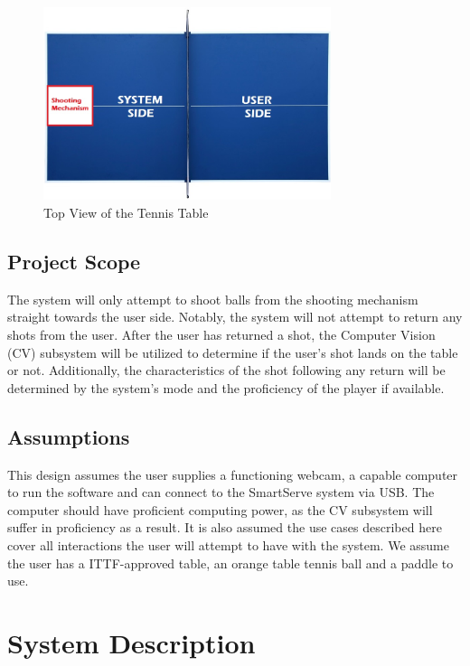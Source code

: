 \documentclass[11pt]{article}
\begin{document}
\begin{figure}[H]
   \centering
   \includegraphics[width=0.75\textwidth]{img/Table-Tennis-Top-View.png} %
   \caption{Top View of the Tennis Table}
   \label{fig:table-tennis-top-view}
\end{figure}
\subsection{Project Scope}
The system will only attempt to shoot balls from the shooting mechanism straight towards the user side. Notably, the system will not attempt to return any shots from the user. After the user has returned a shot, the Computer Vision (CV) subsystem will be utilized to determine if the user's shot lands on the table or not. Additionally, the characteristics of the shot following any return will be determined by the system's mode and the proficiency of the player if available.
\subsection{Assumptions}
This design assumes the user supplies a functioning webcam, a capable computer to run the software and can connect to the SmartServe system via USB. The computer should have proficient computing power, as the CV subsystem will suffer in proficiency as a result. It is also assumed the use cases described here cover all interactions the user will attempt to have with the system. We assume the user has a ITTF-approved table, an orange table tennis ball and a paddle to use.
\section{System Description}
\end{document}

